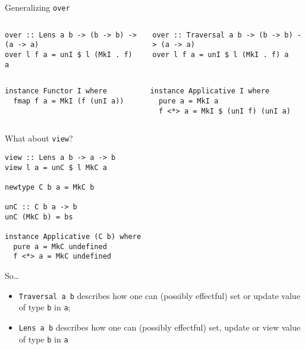 \documentclass[presentation,aspectratio=169,8pt]{beamer}
\begin{document}
\begin{frame}[label={sec:org1b56eef},fragile]{Generalizing \texttt{over}}
 \begin{columns}
\begin{column}{0.5\columnwidth}
\begin{verbatim}
over :: Lens a b -> (b -> b) -> (a -> a)
over l f a = unI $ l (MkI . f) a
\end{verbatim}
\end{column}

\begin{column}{0.5\columnwidth}
\begin{verbatim}
over :: Traversal a b -> (b -> b) -> (a -> a)
over l f a = unI $ l (MkI . f) a
\end{verbatim}
\end{column}
\end{columns}

\begin{columns}
\pause

\begin{column}{0.5\columnwidth}
\begin{verbatim}
instance Functor I where
  fmap f a = MkI (f (unI a))
\end{verbatim}
\end{column}

\begin{column}{0.5\columnwidth}
\begin{verbatim}
instance Applicative I where
  pure a = MkI a
  f <*> a = MkI $ (unI f) (unI a)
\end{verbatim}
\end{column}
\end{columns}
\end{frame}

\begin{frame}[label={sec:orgcaa3ba6},fragile]{What about \texttt{view}?}
 \begin{verbatim}
view :: Lens a b -> a -> b
view l a = unC $ l MkC a

newtype C b a = MkC b

unC :: C b a -> b
unC (MkC b) = bs

instance Applicative (C b) where
  pure a = MkC undefined
  f <*> a = MkC undefined
\end{verbatim}
\end{frame}

\begin{frame}[label={sec:org50fc93f},fragile]{So\ldots{}}
 \begin{itemize}
\item \texttt{Traversal a b} describes how one can (possibly effectful) set or update value
of type \texttt{b} in \texttt{a};
\item \texttt{Lens a b} describes how one can (possibly effectful) set, update or \alert{view}
value of type \texttt{b} in \texttt{a}
\end{itemize}
\end{frame}
\end{document}
